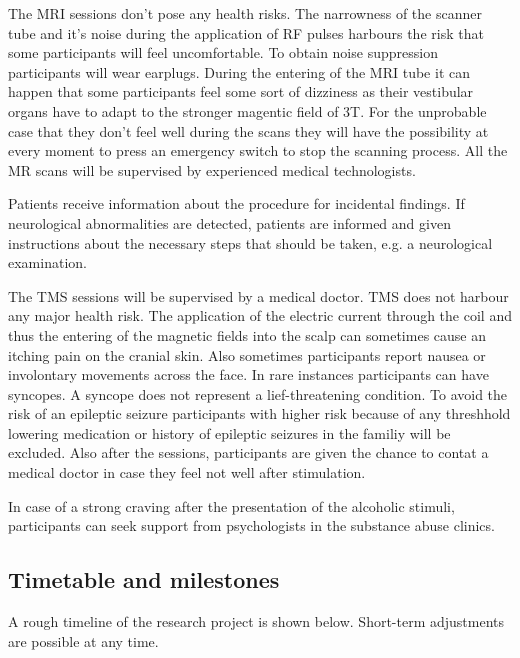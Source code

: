 \documentclass[12pt]{article}
\begin{document}
The MRI sessions don't pose any health risks. The narrowness of the scanner tube and it's noise during the application of RF pulses harbours the risk that some participants will feel uncomfortable. To obtain noise suppression participants will wear earplugs. During the entering of the MRI tube it can happen that some participants feel some sort of dizziness as their vestibular organs have to adapt to the stronger magentic field of 3T. For the unprobable case that they don't feel well during the scans they will have the possibility at every moment to press an emergency switch to stop the scanning process. All the MR scans will be supervised by experienced medical technologists. 

Patients receive information about the procedure for incidental findings. If neurological abnormalities are detected, patients are informed and given instructions about the necessary steps that should be taken, e.g. a neurological examination.

The TMS sessions will be supervised by a medical doctor. TMS does not harbour any major health risk. The application of the electric current through the coil and thus the entering of the magnetic fields into the scalp can sometimes cause an itching pain on the cranial skin. Also sometimes participants report nausea or involontary movements across the face. In rare instances participants can have syncopes. A syncope does not represent a lief-threatening condition. To avoid the risk of an epileptic seizure participants with higher risk because of any threshhold lowering medication or history of epileptic seizures in the familiy will be excluded. Also after the sessions, participants are given the chance to contat a medical doctor in case they feel not well after stimulation. 

In case of a strong craving after the presentation of the alcoholic stimuli, participants can seek support from psychologists in the substance abuse clinics.
 

\subsection{Timetable and milestones}
A rough timeline of the research project is shown below. Short-term adjustments are possible at any time.
\end{document}

